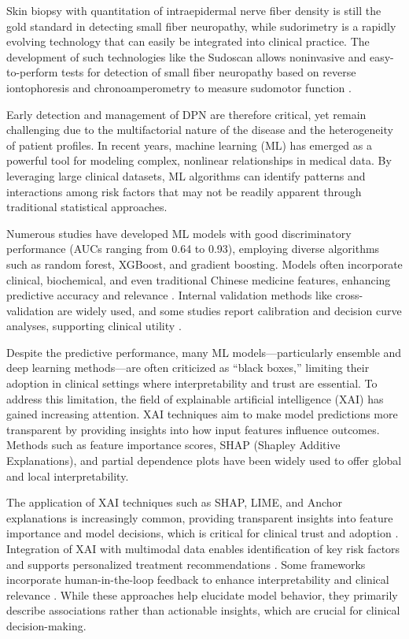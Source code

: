\documentclass[pdflatex,sn-vancouver-num]{sn-jnl}
\begin{document}
Skin biopsy with quantitation of intraepidermal nerve fiber density is still the gold standard in detecting small fiber neuropathy, while sudorimetry is a rapidly evolving technology that can easily be integrated into clinical practice. The development of such technologies like the Sudoscan allows noninvasive and easy-to-perform tests for detection of small fiber neuropathy based on reverse iontophoresis and chronoamperometry to measure sudomotor function \cite{mayaudon:2010newsimple, vinik2015newage}.

Early detection and management of DPN are therefore critical, yet remain challenging due to the multifactorial nature of the disease and the heterogeneity of patient profiles. In recent years, machine learning (ML) has emerged as a powerful tool for modeling complex, nonlinear relationships in medical data. By leveraging large clinical datasets, ML algorithms can identify patterns and interactions among risk factors that may not be readily apparent through traditional statistical approaches. 

Numerous studies have developed ML models with good discriminatory performance (AUCs ranging from 0.64 to 0.93), employing diverse algorithms such as random forest, XGBoost, and gradient boosting. Models often incorporate clinical, biochemical, and even traditional Chinese medicine features, enhancing predictive accuracy and relevance \cite{ma2025machine,jiang2024multifeature,cui2023study,lian2023Study,Wei2024construction}. Internal validation methods like cross-validation are widely used, and some studies report calibration and decision curve analyses, supporting clinical utility \cite{cui2023study}.

Despite the  predictive performance, many ML models—particularly ensemble and deep learning methods—are often criticized as “black boxes,” limiting their adoption in clinical settings where interpretability and trust are essential. To address this limitation, the field of explainable artificial intelligence (XAI) has gained increasing attention. XAI techniques aim to make model predictions more transparent by providing insights into how input features influence outcomes. Methods such as feature importance scores, SHAP (Shapley Additive Explanations), and partial dependence plots have been widely used to offer global and local interpretability. 

The application of XAI techniques such as SHAP, LIME, and Anchor explanations is increasingly common, providing transparent insights into feature importance and model decisions, which is critical for clinical trust and adoption \cite{wu2025prognostic,jiang2024multifeature, pandey2024decoding, wu2024interpretable, sheikh2025predicting}. Integration of XAI with multimodal data enables identification of key risk factors and supports personalized treatment recommendations \cite{nguyen2024interpretable, alHudaibi2025explainable}. Some frameworks incorporate human-in-the-loop feedback to enhance interpretability and clinical relevance \cite{lalwani2025generative}. While these approaches help elucidate model behavior, they primarily describe associations rather than actionable insights, which are crucial for clinical decision-making.
\end{document}
